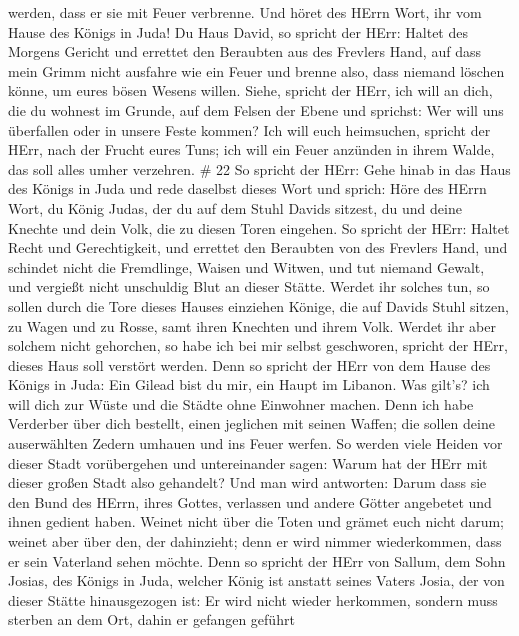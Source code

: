 werden, dass er sie mit Feuer verbrenne.  Und höret des
HErrn Wort, ihr vom Hause des Königs in Juda!  Du Haus
David, so spricht der HErr: Haltet des Morgens Gericht und errettet den
Beraubten aus des Frevlers Hand, auf dass mein Grimm nicht ausfahre wie
ein Feuer und brenne also, dass niemand löschen könne, um eures bösen
Wesens willen.  Siehe, spricht der HErr, ich will an dich,
die du wohnest im Grunde, auf dem Felsen der Ebene und sprichst: Wer
will uns überfallen oder in unsere Feste kommen?  Ich will
euch heimsuchen, spricht der HErr, nach der Frucht eures Tuns; ich will
ein Feuer anzünden in ihrem Walde, das soll alles umher verzehren. \# 22
 So spricht der HErr: Gehe hinab in das Haus des Königs in
Juda und rede daselbst dieses Wort  und sprich: Höre des
HErrn Wort, du König Judas, der du auf dem Stuhl Davids sitzest, du und
deine Knechte und dein Volk, die zu diesen Toren eingehen. 
So spricht der HErr: Haltet Recht und Gerechtigkeit, und errettet den
Beraubten von des Frevlers Hand, und schindet nicht die Fremdlinge,
Waisen und Witwen, und tut niemand Gewalt, und vergießt nicht unschuldig
Blut an dieser Stätte.  Werdet ihr solches tun, so sollen
durch die Tore dieses Hauses einziehen Könige, die auf Davids Stuhl
sitzen, zu Wagen und zu Rosse, samt ihren Knechten und ihrem Volk.
 Werdet ihr aber solchem nicht gehorchen, so habe ich bei
mir selbst geschworen, spricht der HErr, dieses Haus soll verstört
werden.  Denn so spricht der HErr von dem Hause des Königs
in Juda: Ein Gilead bist du mir, ein Haupt im Libanon. Was gilt's? ich
will dich zur Wüste und die Städte ohne Einwohner machen. 
Denn ich habe Verderber über dich bestellt, einen jeglichen mit seinen
Waffen; die sollen deine auserwählten Zedern umhauen und ins Feuer
werfen.  So werden viele Heiden vor dieser Stadt
vorübergehen und untereinander sagen: Warum hat der HErr mit dieser
großen Stadt also gehandelt?  Und man wird antworten: Darum
dass sie den Bund des HErrn, ihres Gottes, verlassen und andere Götter
angebetet und ihnen gedient haben.  Weinet nicht über die
Toten und grämet euch nicht darum; weinet aber über den, der dahinzieht;
denn er wird nimmer wiederkommen, dass er sein Vaterland sehen möchte.
 Denn so spricht der HErr von Sallum, dem Sohn Josias, des
Königs in Juda, welcher König ist anstatt seines Vaters Josia, der von
dieser Stätte hinausgezogen ist: Er wird nicht wieder herkommen,
 sondern muss sterben an dem Ort, dahin er gefangen geführt

